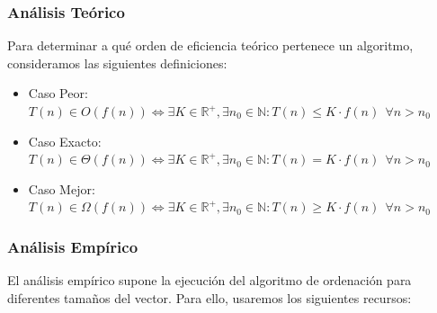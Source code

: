 \documentclass[a4paper,12pt,twoside]{article} %
\begin{document}
\subsubsection{Análisis Teórico}

Para determinar a qué orden de eficiencia teórico pertenece un algoritmo, consideramos las siguientes definiciones:

\begin{itemize}

	\item Caso Peor:\\
	\begin{math}
	T(n) \in O(f(n)) \Leftrightarrow \exists K \in \mathbb{R^+} , \exists n_0 \in \mathbb{N} : T(n) \leq K \cdot{f(n)} \ \ \forall n > n_0
	\end{math}
	
	\item Caso Exacto:\\
	\begin{math}	
	T(n) \in \Theta(f(n)) \Leftrightarrow \exists K \in \mathbb{R^+} , \exists n_0 \in \mathbb{N} : T(n) = K \cdot{f(n)} \ \ \forall n > n_0
	\end{math}
	
	\item Caso Mejor:\\
	\begin{math}
	T(n) \in \Omega(f(n)) \Leftrightarrow \exists K \in \mathbb{R^+} , \exists n_0 \in \mathbb{N} : T(n) \geq K \cdot{f(n)} \ \ \forall n > n_0
	\end{math}
	
\end{itemize}

\vspace{1cm}




\newpage
\subsubsection{Análisis Empírico}

El análisis empírico supone la ejecución del algoritmo de ordenación para diferentes tamaños del vector. Para ello, usaremos los siguientes recursos:\\
\end{document}
